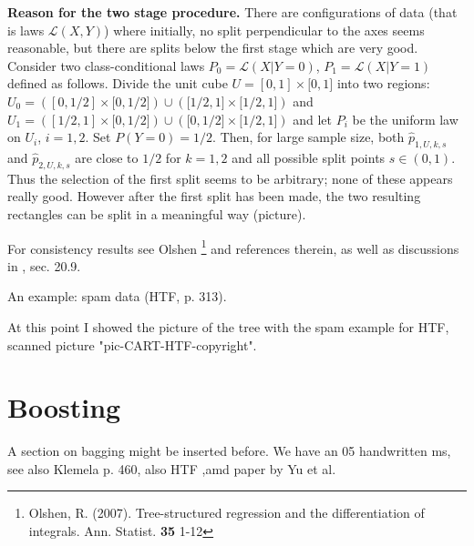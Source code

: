\documentclass[11pt,twoside]{article}%
\theoremstyle{change}
\newenvironment{quote-env}{\begin{quote}\sffamily }{\end{quote}}
\newenvironment{mycomments-env}[1][Mycomments]{\textbf{#1.} \begin{quote-env} }{ \end{quote-env}  \ \rule{0.5em}{0.5em}}
\begin{document}
\bigskip

\bigskip\textbf{Reason for the two stage procedure. }There are configurations
of data (that is laws $\mathcal{L}(X,Y)$) where initially, no split
perpendicular to the axes seems reasonable, but there are splits below the
first stage which are very good. Consider two class-conditional laws
$P_{0}=\mathcal{L}(X|Y=0)$, $P_{1}=\mathcal{L}(X|Y=1)$ defined as follows.
Divide the unit cube $U=[0,1]\times\lbrack0,1]$ into two regions:
$U_{0}=\left(  [0,1/2]\times\lbrack0,1/2]\right)  \cup\left(  \lbrack
1/2,1]\times\lbrack1/2,1]\right)  $ and $U_{1}=\left(  [1/2,1]\times
\lbrack0,1/2]\right)  \cup\left(  \lbrack0,1/2]\times\lbrack1/2,1]\right)  $
and let $P_{i}$ be the uniform law on $U_{i}$, $i=1,2$. Set $P(Y=0)=1/2$.
Then, for large sample size, both $\hat{p}_{1,U,k,s}$ and $\hat{p}_{2,U,k,s}$
are close to $1/2$ for $k=1,2$ and all possible split points $s\in(0,1)$. Thus
the selection of the first split seems to be arbitrary; none of these appears
really good. However after the first split has been made, the two resulting
rectangles can be split in a meaningful way (picture).

For consistency results see Olshen \cite{Olsh}\footnote{Olshen, R. (2007).
Tree-structured regression and the differentiation of integrals. Ann. Statist.
\textbf{35} 1-12} and references therein, as well as discussions in
\cite{DGL}, sec. 20.9.

An example: spam data (HTF, p. 313).%

\begin{mycomments}%


\begin{mycomments-env}
At this point I showed the picture of the tree with the spam example for HTF,
scanned picture "pic-CART-HTF-copyright".
\end{mycomments-env}%

\end{mycomments}%


\newpage

\section{Boosting}%

\begin{mycomments}%


\begin{mycomments-env}
A section on bagging might be inserted before. We have an 05 handwritten ms,
see also Klemela p. 460, also HTF ,amd paper by Yu et al.
\end{mycomments-env}%

\end{mycomments}%
\bigskip
\end{document}
